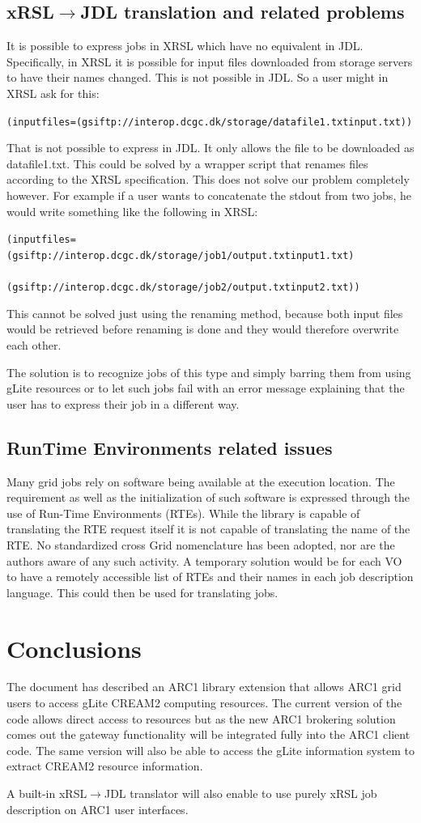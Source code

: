\documentclass{article}
\begin{document}
\subsection{xRSL${\rightarrow}$JDL translation and related problems}
It is possible to express jobs in XRSL which have no equivalent in JDL. Speciﬁcally, in XRSL it is possible for input files downloaded from storage servers to have their names changed. This is not possible in JDL. So a user might in XRSL ask for this:
\begin{shaded}
\verb#(inputfiles=(gsiftp://interop.dcgc.dk/storage/datafile1.txtinput.txt))#
\end{shaded}
That is not possible to express in JDL. It only allows the file to be downloaded as datafile1.txt. This could be solved by a wrapper script that renames files according to the XRSL speciﬁcation. This does not solve our problem completely however. For example if a user wants to concatenate the stdout from two jobs, he would write something like the following in XRSL:
\begin{shaded}
\verb#(inputfiles=(gsiftp://interop.dcgc.dk/storage/job1/output.txtinput1.txt)#\\
\verb#            (gsiftp://interop.dcgc.dk/storage/job2/output.txtinput2.txt))#
\end{shaded}
This cannot be solved just using the renaming method, because both input files would be retrieved before renaming is done and they would therefore overwrite each other.\par
The solution is to recognize jobs of this type and simply barring them from using gLite resources or to let such jobs fail with an error message explaining that the user has to express their job in a different way.
\subsection{RunTime Environments related issues}
Many grid jobs rely on software being available at the execution location. The requirement as well as the initialization 
of such software is expressed through the use of Run-Time Environments (RTEs). While the library is capable of 
translating the RTE request itself it is not capable of translating the name of the RTE. No standardized cross Grid 
nomenclature has been adopted, nor are the authors aware of any such activity. A temporary solution would be for each 
VO to have a remotely accessible list of RTEs and their names in each job description language. This could then be used for translating jobs.
\section{Conclusions}
\label{Conclusions}
The document has described an ARC1 library extension that allows ARC1 grid users to access gLite CREAM2 computing resources. The current version of the code allows direct access to resources but as the new ARC1 brokering solution comes out the gateway functionality will be integrated fully into the ARC1 client code. The same version will also be able to access the gLite information system to extract CREAM2 resource information.\par
A built-in xRSL${\rightarrow}$JDL translator will also enable to use purely xRSL job description on ARC1 user interfaces.
\end{document}
